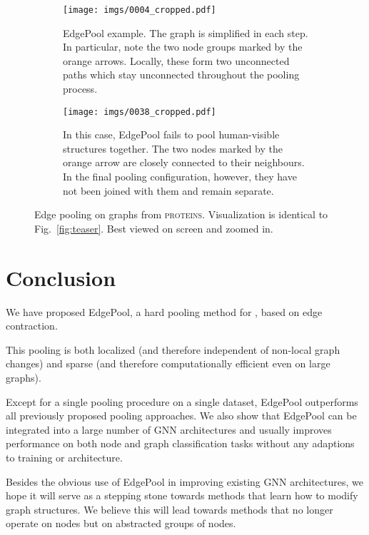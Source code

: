 \documentclass{article}
\newcommand{\figref}[1]{Fig.~\ref{#1}}
\newcommand{\edgepool}{EdgePool}
\newcommand{\datasetname}[1]{\textsc{#1}}
\newcommand{\proteins}{\datasetname{proteins}}
\begin{document}
\begin{figure}
	\centering
	\begin{subfigure}[b]{1.0\textwidth}
	\centering
	\texttt{[image: imgs/0004\_cropped.pdf]}
	\caption{\edgepool{} example. The graph is simplified in each step. In particular, note the two node groups marked by the orange arrows. Locally, these form two unconnected paths which stay unconnected throughout the pooling process.}
	\label{fig:pooling_example}
	\end{subfigure}

	\begin{subfigure}[b]{1.0\textwidth}
	\centering
	\texttt{[image: imgs/0038\_cropped.pdf]}
	\caption{In this case, \edgepool{} fails to pool human-visible structures together. The two nodes marked by the orange arrow are closely connected to their neighbours. In the final pooling configuration, however, they have not been joined with them and remain separate.}
	\label{fig:failure_case}
	\end{subfigure}
	\caption{Edge pooling on graphs from \proteins{}. Visualization is identical to \figref{fig:teaser}. Best viewed on screen and zoomed in.}
	\label{fig:plotted_graphs}
\end{figure}
 
\section{Conclusion}

We have proposed \edgepool{}, a hard pooling method for , based on edge contraction.

This pooling is both localized (and therefore independent of non-local graph changes) and sparse (and therefore computationally efficient even on large graphs). 

Except for a single pooling procedure on a single dataset, \edgepool{} outperforms all previously proposed pooling approaches. We also show that \edgepool{} can be integrated into a large number of \gls{GNN} architectures and usually improves performance on both node and graph classification tasks without any adaptions to training or architecture.

Besides the obvious use of \edgepool{} in improving existing \gls{GNN} architectures, we hope it will serve as a stepping stone towards methods that learn how to modify graph structures. We believe this will lead towards methods that no longer operate on nodes but on abstracted groups of nodes. 
\newpage



\end{document}

